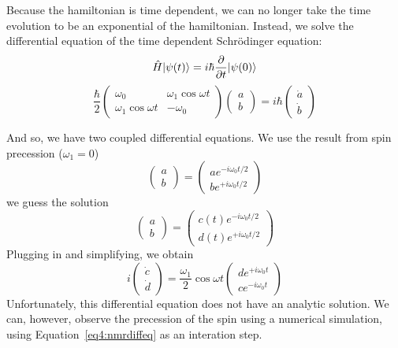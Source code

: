 Because the hamiltonian is time dependent, we can no longer take the time evolution to be an exponential of the hamiltonian. Instead, we solve the differential equation of the time dependent Schr\"odinger equation:
\[\hat{H}\lvert\psi(t)\rangle=i\hbar\frac{\partial }{\partial t}\lvert\psi(0)\rangle\]
\begin{equation}
\frac{\hbar}{2} \begin{pmatrix}
	\omega_0 & \omega_1\cos\omega t\\ \omega_1\cos\omega t & -\omega_0
\end{pmatrix} \begin{pmatrix}
	a\\b
\end{pmatrix} =i\hbar \begin{pmatrix}
	\dot a\\ \dot b
\end{pmatrix}\label{eq4:mrham}
\end{equation}

And so, we have two coupled differential equations. We use the result from spin precession (\(\omega_1=0\))
\[ \begin{pmatrix}
	a \\ b
\end{pmatrix} = \begin{pmatrix}
a e^{-i\omega_0 t/2} \\
b e^{+i\omega_0 t/2}
\end{pmatrix}\]
we guess the solution
\[ \begin{pmatrix}
	a\\b
\end{pmatrix} = \begin{pmatrix}
c(t)e^{-i\omega_0t/2}\\
d(t)e^{+i\omega_0t/2}
\end{pmatrix}\]
Plugging in and simplifying, we obtain
\begin{equation}
	i \begin{pmatrix}
	\dot c \\ \dot d
\end{pmatrix} = \frac{\omega_1}{2}\cos\omega t \begin{pmatrix}
de^{+i\omega_0t}\\ce^{-i\omega_0t}
\end{pmatrix} \label{eq4:nmrdiffeq}
\end{equation}
Unfortunately, this differential equation does not have an analytic solution. We can, however, observe the precession of the spin using a numerical simulation, using Equation~\ref{eq4:nmrdiffeq} as an interation step.

